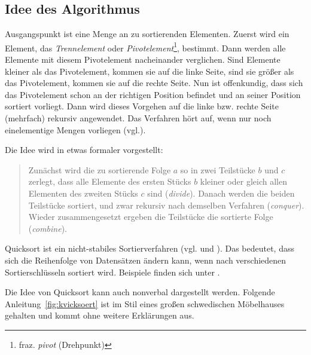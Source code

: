 \documentclass[11pt, a4paper, oneside, openright]{article}
\newcommand \vgl{vgl.\xspace }
\begin{document}
\subsection{Idee des Algorithmus}
\label{sec:ideeQuicksort}
Ausgangspunkt ist eine Menge an zu sortierenden Elementen. Zuerst wird ein Element, das \emph{Trennelement} oder \emph{Pivotelement}\footnote{fraz. \emph{pivot} (Drehpunkt)}, bestimmt. Dann werden alle Elemente mit diesem Pivotelement nacheinander verglichen. Sind Elemente kleiner als das Pivotelement, kommen sie auf die linke Seite, sind sie größer als das Pivotelement, kommen sie auf die rechte Seite. Nun ist offenkundig, dass sich das Pivotelement schon an der richtigen Position befindet und an seiner Position sortiert vorliegt. Dann wird dieses Vorgehen auf die linke bzw. rechte Seite (mehrfach) rekursiv angewendet. Das Verfahren hört auf, wenn nur noch einelementige Mengen vorliegen (\vgl \cite{hoare}\cite{wikiQS}).

Die Idee wird in \cite{uniflensburgQS} etwas formaler vorgestellt: 

\begin{quote}
Zunächst wird die zu sortierende Folge $a$ so in zwei Teilstücke $b$ und $c$ zerlegt, dass alle Elemente des ersten Stücks $b$ kleiner oder gleich allen Elementen des zweiten Stücks $c$ sind (\emph{divide}). Danach werden die beiden Teilstücke sortiert, und zwar rekursiv nach demselben Verfahren (\emph{conquer}). Wieder zusammengesetzt ergeben die Teilstücke die sortierte Folge (\emph{combine}).

\hfill\cite{uniflensburgQS}
\end{quote}

Quicksort ist ein nicht-stabiles Sortierverfahren (\vgl \cite{wikiQS} und \cite{wikiStabilitaet}). Das bedeutet, dass sich die Reihenfolge von Datensätzen ändern kann, wenn nach verschiedenen Sortierschlüsseln sortiert wird. Beispiele finden sich unter \cite{wikiStabilitaet}.

Die Idee von Quicksort kann auch nonverbal dargestellt werden. Folgende Anleitung~\ref{fig:kvicksoert} ist im Stil eines großen schwedischen Möbelhauses gehalten und kommt ohne weitere Erklärungen aus. 
\end{document}
